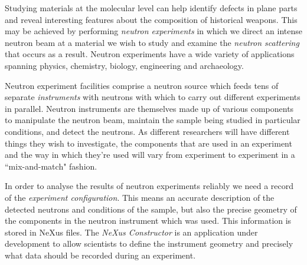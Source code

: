 \iffalse
The NeXus file format arose out of a desire to describe the configurations of neutron, muon, and X-ray experiments in a way that is ``facility-neutral." However, the format is not particularly easy to work with for the uninitiated. This can be especially frustrating to scientists who would much rather get their data and get on with their day. The NeXus Constructor, a tool being developed by software developers based at ISIS Pulsed Muon and Neutron Source in the UK and the European Spallation Source (ESS) in Sweden, attempts to address this problem by providing an interface for users to easily examine and modify the contents of NeXus files.
\fi
Studying materials at the molecular level can help identify defects in plane parts and reveal interesting features about the composition of historical weapons. This may be achieved by performing \textit{neutron experiments} in which we direct an intense neutron beam at a material we wish to study and examine the \textit{neutron scattering} that occurs as a result. Neutron experiments have a wide variety of applications spanning physics, chemistry, biology, engineering and archaeology.

\iffalse ISIS Pulsed Muon and Neutron Source at the Rutherford Appleton Laboratory in the UK is currently collaborating on software with the European Spallation Source (ESS) which is being built in Sweden. \fi Neutron experiment facilities comprise a neutron source which feeds tens of separate \textit{instruments} with neutrons with which to carry out different experiments in parallel. Neutron instruments are themselves made up of various components to manipulate the neutron beam, maintain the sample being studied in particular conditions, and detect the neutrons. As different researchers will have different things they wish to investigate, the components that are used in an experiment and the way in which they're used will vary from experiment to experiment in a ``mix-and-match" fashion.

In order to analyse the results of neutron experiments reliably we need a record of the \textit{experiment configuration}. This means an accurate description of the detected neutrons and conditions of the sample, but also the precise geometry of the components in the neutron instrument which was used. This information is stored in NeXus files. The \textit{NeXus Constructor} is an application under development to allow scientists to define the instrument geometry and precisely what data should be recorded during an experiment.

